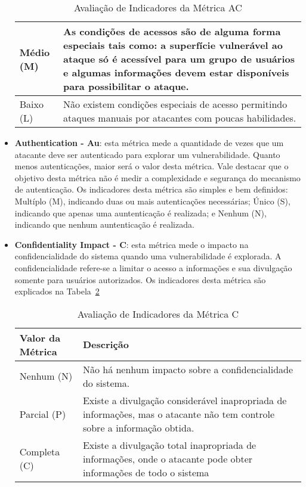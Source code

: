 \begin{itemize}
\begin{table}[H]
\begin{center}
\begin{tabular}{ | l | l |}
	    Médio (M) & As condições de acessos são de alguma forma especiais tais como: a superfície vulnerável ao ataque só é acessível para um grupo de usuários e algumas informações devem estar disponíveis para possibilitar o ataque. \\ \hline
	    Baixo (L) & Não existem condições especiais de acesso permitindo ataques manuais por atacantes com poucas habilidades.\\ \hline
	    \end{tabular}
	    \caption{Avaliação de Indicadores da Métrica AC}
	    \label{tab:ac_scoring}
	\end{center}
	\end{table}
\item \textbf{Authentication - Au}: esta métrica mede a quantidade de vezes que um atacante deve ser autenticado para explorar um vulnerabilidade. Quanto menos autenticações, maior será o valor desta métrica. Vale destacar que o objetivo desta métrica não é medir a complexidade e segurança do mecanismo de autenticação. Os indicadores desta métrica são simples e bem definidos: Multíplo (M), indicando duas ou mais autenticações necessárias; Único (S), indicando que apenas uma auntenticação é realizada; e Nenhum (N), indicando que nenhum auntenticação é realizada.
\item \textbf{Confidentiality Impact - C}: esta métrica mede o impacto na confidencialidade do sistema quando uma vulnerabilidade é explorada. A confidencialidade refere-se a limitar o acesso a informações e sua divulgação somente para usuários autorizados. Os indicadores desta métrica são explicados na Tabela~\ref{tab:c_scoring}
	\begin{table}[H]
	\begin{center}
	    \begin{tabular}{ | l | l |}
	    \hline
	    Valor da Métrica & Descrição \\ \hline
	    Nenhum (N) & Não há nenhum impacto sobre a confidencialidade do sistema. \\ \hline
	    Parcial (P) & Existe a divulgação considerável inapropriada de informações, mas o atacante não tem controle sobre a informação obtida.  \\ \hline
	    Completa (C) & Existe a divulgação total inapropriada de informações, onde o atacante pode obter informações de todo o sistema\\ \hline
	    \end{tabular}
	    \caption{Avaliação de Indicadores da Métrica C}
	    \label{tab:c_scoring}
	\end{center}
	\end{table}

\end{itemize}

